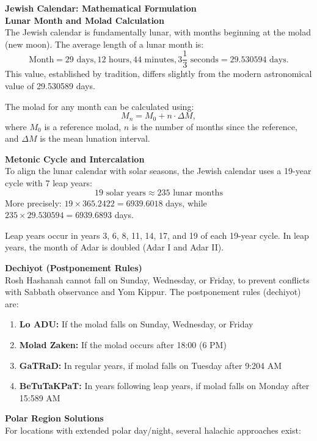 \begin{technical}
{\Large\textbf{Jewish Calendar: Mathematical Formulation}}\\[0.7em]

\textbf{Lunar Month and Molad Calculation}\\[0.5em]
The Jewish calendar is fundamentally lunar, with months beginning at the molad (new moon). The average length of a lunar month is:
$$
\text{Month} = 29 \text{ days}, 12 \text{ hours}, 44 \text{ minutes}, 3\frac{1}{3} \text{ seconds} = 29.530594 \text{ days}.
$$
This value, established by tradition, differs slightly from the modern astronomical value of 29.530589 days.

The molad for any month can be calculated using:
$$
M_n = M_0 + n \cdot \Delta M,
$$
where $M_0$ is a reference molad, $n$ is the number of months since the reference, and $\Delta M$ is the mean lunation interval.

\textbf{Metonic Cycle and Intercalation}\\[0.5em]
To align the lunar calendar with solar seasons, the Jewish calendar uses a 19-year cycle with 7 leap years:
$$
19 \text{ solar years} \approx 235 \text{ lunar months}
$$
More precisely: $19 \times 365.2422 = 6939.6018$ days, while $235 \times 29.530594 = 6939.6893$ days.

Leap years occur in years 3, 6, 8, 11, 14, 17, and 19 of each 19-year cycle. In leap years, the month of Adar is doubled (Adar I and Adar II).

\textbf{Dechiyot (Postponement Rules)}\\[0.5em]
Rosh Hashanah cannot fall on Sunday, Wednesday, or Friday, to prevent conflicts with Sabbath observance and Yom Kippur. The postponement rules (dechiyot) are:

\begin{enumerate}
\item \textbf{Lo ADU:} If the molad falls on Sunday, Wednesday, or Friday
\item \textbf{Molad Zaken:} If the molad occurs after 18:00 (6 PM)
\item \textbf{GaTRaD:} In regular years, if molad falls on Tuesday after 9:204 AM
\item \textbf{BeTuTaKPaT:} In years following leap years, if molad falls on Monday after 15:589 AM
\end{enumerate}

\textbf{Polar Region Solutions}\\[0.5em]
For locations with extended polar day/night, several halachic approaches exist:


\end{technical}
